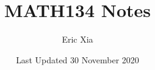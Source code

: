 \documentclass{article}
\title{MATH134 Notes}
\author{Eric Xia}
\date{Last Updated 30 November 2020}
\begin{document}
    \maketitle
    \tableofcontents
    \pagebreak


    
    
    
    
    
    
    

%    
\end{document}
